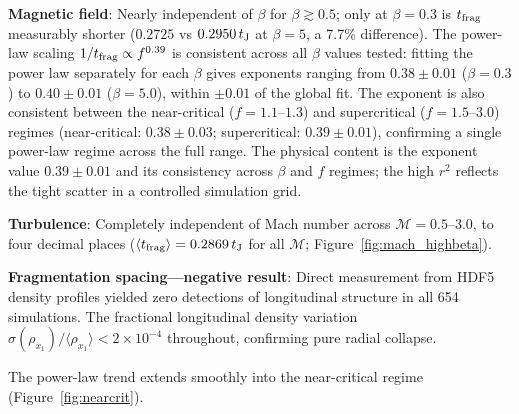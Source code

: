 \documentclass[twoside,twocolumn]{mnras}
\begin{document}
\textbf{Magnetic field}: Nearly independent of $\beta$ for $\beta \gtrsim 0.5$; only
at $\beta = 0.3$ is $t_{\rm frag}$ measurably shorter ($0.2725$ vs $0.2950\,t_{\rm J}$
at $\beta = 5$, a 7.7\% difference). The power-law scaling $1/t_{\rm frag} \propto f^{0.39}$
is consistent across all $\beta$ values tested: fitting the power law separately for each
$\beta$ gives exponents ranging from $0.38 \pm 0.01$ ($\beta = 0.3$) to $0.40 \pm 0.01$
($\beta = 5.0$), within $\pm 0.01$ of the global fit. The exponent is also consistent
between the near-critical ($f = 1.1$--$1.3$) and supercritical ($f = 1.5$--$3.0$)
regimes (near-critical: $0.38 \pm 0.03$; supercritical: $0.39 \pm 0.01$), confirming
a single power-law regime across the full range. The physical content is the exponent value $0.39 \pm 0.01$ and its consistency across $\beta$ and $f$ regimes; the high $r^2$ reflects the tight scatter in a controlled simulation grid.

\textbf{Turbulence}: Completely independent of Mach number across $\mathcal{M} = 0.5$--$3.0$,
to four decimal places ($\langle t_{\rm frag} \rangle = 0.2869\,t_{\rm J}$ for all $\mathcal{M}$;
Figure~\ref{fig:mach_highbeta}).

\textbf{Fragmentation spacing---negative result}: Direct measurement from HDF5 density
profiles yielded zero detections of longitudinal structure in all 654 simulations.
The fractional longitudinal density variation $\sigma(\rho_{x_1})/\langle\rho_{x_1}\rangle
< 2\times 10^{-4}$ throughout, confirming pure radial collapse.

The power-law trend extends smoothly into the near-critical regime
(Figure~\ref{fig:nearcrit}).
\end{document}
